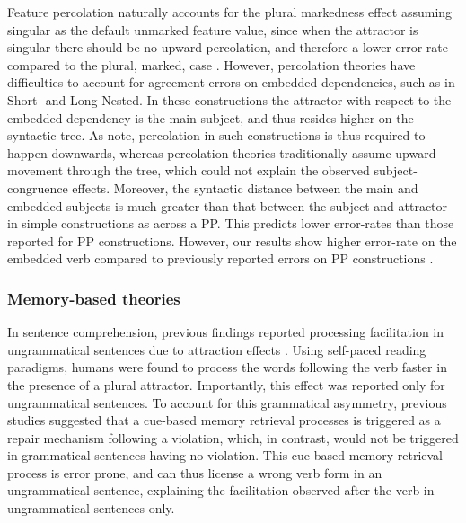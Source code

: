 Feature percolation naturally accounts for the plural markedness effect assuming singular as the default unmarked feature value,
since when the attractor is singular there should be no upward percolation, and therefore a lower error-rate compared to the plural, marked, case \citep{pearlmutter1999agreement}. However, percolation theories have difficulties to account for agreement errors on embedded dependencies, such as in Short- and Long-Nested. In these constructions the attractor with respect to the embedded dependency is the main subject, and thus resides higher on the syntactic tree. As \citet{wagers2009agreement} note, percolation in such constructions is thus required to happen downwards, whereas percolation theories traditionally assume upward movement through the tree, which could not explain the observed subject-congruence effects. Moreover, the syntactic distance between the main and embedded subjects is much greater than that between the subject and attractor in simple constructions as across a PP. This predicts lower error-rates than those reported for PP constructions. However, our results show higher error-rate on the embedded verb compared to previously reported errors on PP constructions \citep{vigliocco1995constructing}.

\subsubsection{Memory-based theories}
In sentence comprehension, previous findings reported processing facilitation in ungrammatical sentences due to attraction effects \citep[e.g., ][]{pearlmutter1999agreement, wagers2009agreement, lago2015agreement}. Using self-paced reading paradigms, humans were found to process the words following the verb faster in the presence of a plural attractor. Importantly, this effect was reported only for ungrammatical sentences. To account for this grammatical asymmetry, previous studies suggested that a cue-based memory retrieval processes \citep{lewis2005activation} is triggered as a repair mechanism following a violation, which, in contrast, would not be triggered in grammatical sentences having no violation. This cue-based memory retrieval process is error prone, and can thus license a wrong verb form in an ungrammatical sentence, explaining the facilitation observed after the verb in ungrammatical sentences only. 


